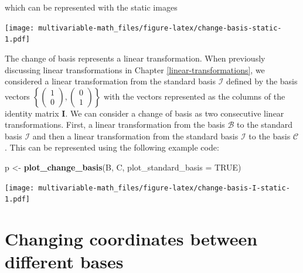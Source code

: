 \documentclass[
]{book}
\newenvironment{Shaded}{\begin{snugshade}}{\end{snugshade}}
\newcommand{\DataTypeTok}[1]{\textcolor[rgb]{0.13,0.29,0.53}{#1}}
\newcommand{\KeywordTok}[1]{\textcolor[rgb]{0.13,0.29,0.53}{\textbf{#1}}}
\newcommand{\NormalTok}[1]{#1}
\newcommand{\OtherTok}[1]{\textcolor[rgb]{0.56,0.35,0.01}{#1}}
\newcommand{\StringTok}[1]{\textcolor[rgb]{0.31,0.60,0.02}{#1}}
\theoremstyle{definition}
\theoremstyle{definition}
\theoremstyle{definition}
\theoremstyle{definition}
\theoremstyle{remark}
\begin{document}
which can be represented with the static images

\texttt{[image: multivariable-math\_files/figure-latex/change-basis-static-1.pdf]}

The change of basis represents a linear transformation. When previously discussing linear transformations in Chapter \ref{linear-transformations}, we considered a linear transformation from the standard basis \(\mathcal{I}\) defined by the basis vectors \(\left\{ \begin{pmatrix} 1 \\ 0 \end{pmatrix}, \begin{pmatrix} 0 \\ 1 \end{pmatrix} \right\}\) with the vectors represented as the columns of the identity matrix \(\mathbf{I}\). We can consider a change of basis as two consecutive linear transformations. First, a linear transformation from the basis \(\mathcal{B}\) to the standard basis \(\mathcal{I}\) and then a linear transformation from the standard basis \(\mathcal{I}\) to the basis \(\mathcal{C}\). This can be represented using the following example code:

\begin{Shaded}
\begin{Highlighting}[]
\NormalTok{p <-}\StringTok{ }\KeywordTok{plot_change_basis}\NormalTok{(B, C, }\DataTypeTok{plot_standard_basis =} \OtherTok{TRUE}\NormalTok{)}
\end{Highlighting}
\end{Shaded}

\texttt{[image: multivariable-math\_files/figure-latex/change-basis-I-static-1.pdf]}

\hypertarget{changing-coordinates-between-different-bases}{%
\section{Changing coordinates between different bases}\label{changing-coordinates-between-different-bases}}
\end{document}
